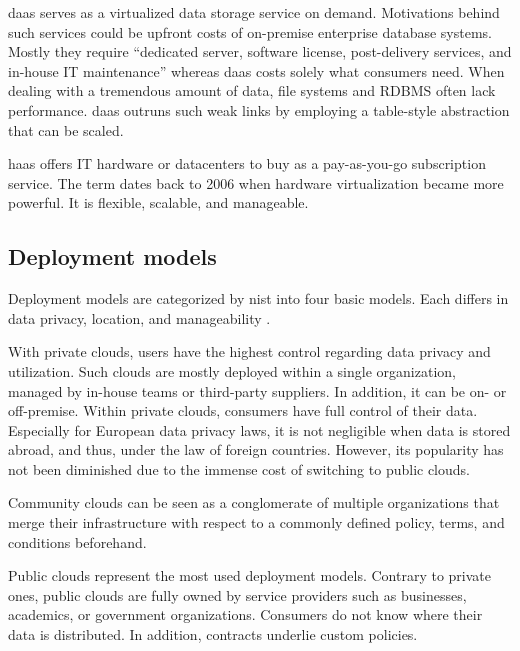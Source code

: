 \ac{daas} serves as a virtualized data storage service on demand.
Motivations behind such services could be upfront costs of on-premise enterprise database systems. \cite{Dillon2010}
Mostly they require \enquote{dedicated server, software license, post-delivery services, and in-house IT maintenance} \cite{Dillon2010} whereas \ac{daas} costs solely what consumers need.
When dealing with a tremendous amount of data, file systems and RDBMS often lack performance.
\ac{daas} outruns such weak links by employing a table-style abstraction that can be scaled. \cite{Dillon2010}

\ac{haas} offers IT hardware or datacenters to buy as a pay-as-you-go subscription service.
The term dates back to 2006 when hardware virtualization became more powerful.
It is flexible, scalable, and manageable. \cite{Wang2010}

\subsection{Deployment models}
\label{subsec:cloud-deployment}

Deployment models are categorized by \ac{nist} into four basic models.
Each differs in data privacy, location, and manageability \cite{Mell2011}.

With private clouds, users have the highest control regarding data privacy and utilization.
Such clouds are mostly deployed within a single organization, managed by in-house teams or third-party suppliers.
In addition, it can be on- or off-premise.
Within private clouds, consumers have full control of their data.
Especially for European data privacy laws, it is not negligible when data is stored abroad, and thus, under the law of foreign countries.
However, its popularity has not been diminished due to the immense cost of switching to public clouds. \cite{Dillon2010, Mell2011}

Community clouds can be seen as a conglomerate of multiple organizations that merge their infrastructure with respect to a commonly defined policy, terms, and conditions beforehand. \cite{Mell2011}

Public clouds represent the most used deployment models.
Contrary to private ones, public clouds are fully owned by service providers such as businesses, academics, or government organizations.
Consumers do not know where their data is distributed.
In addition, contracts underlie custom policies. \cite{Mell2011}

